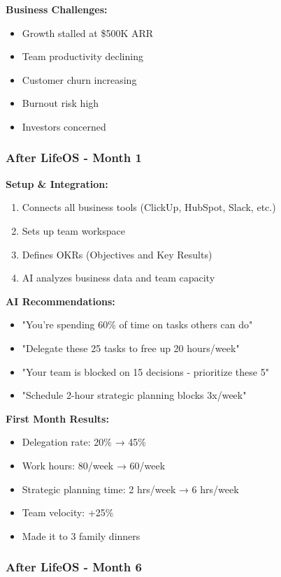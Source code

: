 \textbf{Business Challenges:}
\begin{itemize}
    \item Growth stalled at \$500K ARR
    \item Team productivity declining
    \item Customer churn increasing
    \item Burnout risk high
    \item Investors concerned
\end{itemize}

\subsubsection{After LifeOS - Month 1}

\textbf{Setup \& Integration:}
\begin{enumerate}
    \item Connects all business tools (ClickUp, HubSpot, Slack, etc.)
    \item Sets up team workspace
    \item Defines OKRs (Objectives and Key Results)
    \item AI analyzes business data and team capacity
\end{enumerate}

\textbf{AI Recommendations:}
\begin{itemize}
    \item "You're spending 60\% of time on tasks others can do"
    \item "Delegate these 25 tasks to free up 20 hours/week"
    \item "Your team is blocked on 15 decisions - prioritize these 5"
    \item "Schedule 2-hour strategic planning blocks 3x/week"
\end{itemize}

\textbf{First Month Results:}
\begin{itemize}
    \item Delegation rate: 20\% → 45\%
    \item Work hours: 80/week → 60/week
    \item Strategic planning time: 2 hrs/week → 6 hrs/week
    \item Team velocity: +25\%
    \item Made it to 3 family dinners
\end{itemize}

\subsubsection{After LifeOS - Month 6}

